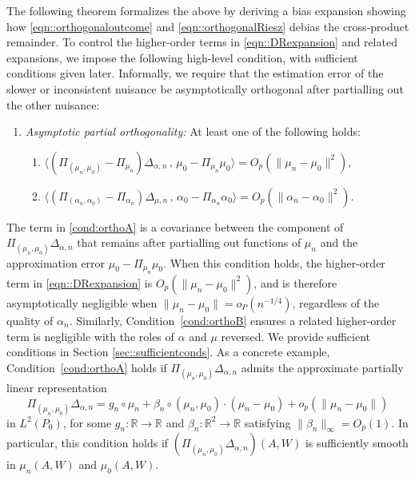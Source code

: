 \documentclass[11pt]{article}
\theoremstyle{plain}
\begin{document}
The following theorem formalizes the above by deriving a bias expansion showing
how \eqref{eqn::orthogonaloutcome} and \eqref{eqn::orthogonalRiesz} debias the
cross-product remainder. To control the higher-order terms in
\eqref{eqn::DRexpansion} and related expansions, we impose the following
high-level condition, with sufficient conditions given later. Informally, we
require that the estimation error of the slower or inconsistent nuisance be
asymptotically orthogonal after partialling out the other nuisance:
\begin{enumerate}[label=\bf{B\arabic*)}, ref={B\arabic*},series=sketch]
  \item \textit{Asymptotic partial orthogonality:} At least one of the following holds: \label{cond:ortho} 
    \begin{enumerate}[label={\roman*)}, ref={\ref{cond:ortho}\roman*}]\vspace{-.05in}
      \item \label{cond:orthoA} \(\langle (\Pi_{(\mu_n , \mu_0)}-\Pi_{\mu_n})\Delta_{\alpha,n}
        \,,\, \mu_0 - \Pi_{\mu_n} \mu_0 \rangle = O_p(\|\mu_n -  \mu_0\|^2)\),\vspace{-.05in}
      \item \label{cond:orthoB} \(\langle (\Pi_{(\alpha_n , \alpha_0)}-\Pi_{\alpha_n})\Delta_{\mu,n}
        \,,\, \alpha_0 - \Pi_{\alpha_n} \alpha_0 \rangle = O_p(\|\alpha_n -  \alpha_0\|^2)\).
    \end{enumerate}
\end{enumerate}
The term in \ref{cond:orthoA} is a covariance between the
component of \(\Pi_{(\mu_n,\mu_0)}\Delta_{\alpha,n}\) that remains after
partialling out functions of \(\mu_n\) and the approximation error
\(\mu_0-\Pi_{\mu_n}\mu_0\). When this condition holds, the higher-order term in
\eqref{eqn::DRexpansion} is \(O_p(\|\mu_n-\mu_0\|^2)\), and is therefore
asymptotically negligible when \(\|\mu_n-\mu_0\| = o_P(n^{-1/4})\), regardless
of the quality of \(\alpha_n\). Similarly, Condition~\ref{cond:orthoB} ensures a related higher-order term is negligible  with the roles of $\alpha$ and $\mu$ reversed. We provide sufficient conditions in Section \ref{sec::sufficientconds}. As a concrete example, Condition~\ref{cond:orthoA} holds if \(\Pi_{(\mu_n,\mu_0)}\Delta_{\alpha,n}\) admits the approximate partially linear representation 
\begin{equation}
\label{eqn::PLM}
    \Pi_{(\mu_n,\mu_0)}\Delta_{\alpha,n} = g_n \circ \mu_n + \beta_n \circ (\mu_n,\mu_0)\cdot(\mu_n-\mu_0) + o_p(\|\mu_n-\mu_0\|)
\end{equation}
in \(L^2(P_0)\), for some \(g_n\colon \mathbb{R}\to\mathbb{R}\) and \(\beta_n\colon \mathbb{R}^2\to\mathbb{R}\) satisfying \(\|\beta_n\|_{\infty}=O_p(1)\). In particular, this condition holds if \((\Pi_{(\mu_n,\mu_0)}\Delta_{\alpha,n})(A,W)\) is sufficiently smooth in \(\mu_n(A,W)\) and \(\mu_0(A,W)\).
\end{document}
